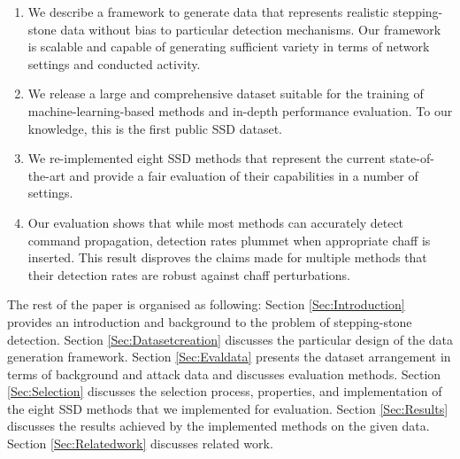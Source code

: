 \documentclass[runningheads,11pt]{llncs}\usepackage[]{graphicx}\usepackage[]{color}
\begin{document}
\begin{enumerate}
\item We describe a framework to generate data that represents realistic stepping-stone data without bias to particular detection mechanisms. Our framework is scalable and capable of generating sufficient variety in terms of network settings and conducted activity. 
\item We release a large and comprehensive dataset suitable for the training of machine-learning-based methods and in-depth performance evaluation. To our knowledge, this is the first public SSD dataset.
\item We re-implemented eight SSD methods that represent the current state-of-the-art and provide a fair evaluation of their capabilities in a number of settings. 
\item Our evaluation shows that while most methods can accurately detect command propagation, detection rates plummet when appropriate chaff is inserted. This result disproves the claims made for multiple methods that their detection rates are robust against chaff perturbations.
\end{enumerate} %

The rest of the paper is organised as following: Section \ref{Sec:Introduction} provides an introduction and background to the problem of stepping-stone detection. Section \ref{Sec:Datasetcreation} discusses the particular design of the data generation framework.
Section \ref{Sec:Evaldata} presents the dataset arrangement in terms of background and attack data and discusses evaluation methods. Section \ref{Sec:Selection} discusses the selection process, properties, and implementation of the eight SSD methods that we implemented for evaluation. Section \ref{Sec:Results} discusses the results achieved by the implemented methods on the given data. Section \ref{Sec:Relatedwork} discusses related work.
\end{document}
